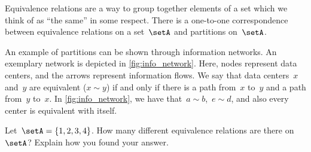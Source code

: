 \begin{remark}
    Equivalence relations are a way to group together elements of a set which we think of as ``the same'' in some respect.
    There is a one-to-one correspondence between equivalence relations on a set~$\setA$ and partitions on~$\setA$.
\end{remark}

\begin{marginfigure}
    \centering
    \caption{
        \label{fig:info_network}
    }
\end{marginfigure}

\begin{example}
    An example of partitions can be shown through information networks.
    An exemplary network is depicted in \cref{fig:info_network}.
    Here, nodes represent data centers, and the arrows represent information flows.
    We say that data centers~$x$ and~$y$ are equivalent ($x\sim y$) if and only if there is a path from~$x$ to~$y$ and a path from~$y$ to~$x$.
    In \cref{fig:info_network}, we have that~$a\sim b$,~$e\sim d$, and also every center is equivalent with itself.
\end{example}

\vfill
\begin{gradedexercise}
    \label{ex:CountingEquivalenceRelations}
    Let~$\setA = \{ 1, 2, 3, 4 \}$.
    How many different equivalence relations are there on $\setA$?
    Explain how you found your answer.
\end{gradedexercise}

